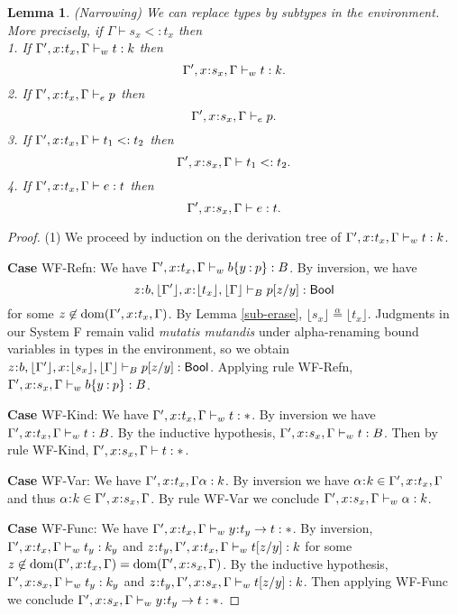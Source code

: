 \documentclass[11pt]{article}
\newtheorem{lemma}[theorem]{Lemma}
\newcommand{\al}{\alpha}
\newcommand{\bind}{\hspace{0.05em}{:}\hspace{0.05em}} %
\newcommand{\col}{\mathbin{:}}       %
\newcommand{\Bool}{{\sf Bool}}
\newcommand{\functype}[3]{#1\bind #2 \rightarrow #3}
\newcommand{\dom}[1]{{\rm dom}(#1)}
\begin{document}
\begin{lemma}\label{subtype-env} (Narrowing)
We can replace types by subtypes in the environment. More precisely, if $\Gamma \vdash s_x <: t_x$ then \\
1. If $\Gamma', x\bind t_x, \Gamma \vdash_w t : k$ then
\[
\Gamma', x\bind s_x, \Gamma \vdash_w t : k.
\]
2. If $\Gamma', x\bind t_x, \Gamma \vdash_e p$ then 
\[
\Gamma', x\bind s_x, \Gamma \vdash_e p. 
\]
3. If $\Gamma', x\bind t_x, \Gamma \vdash t_1 <: t_2$ then
\[
\Gamma', x\bind s_x, \Gamma \vdash t_1 <: t_2.
\]
4. If $\Gamma', x\bind t_x, \Gamma \vdash e : t$ then
\[
\Gamma', x\bind s_x, \Gamma \vdash e : t.
\]
\end{lemma}
\begin{proof}
(1) We proceed by induction on the derivation tree of $\Gamma', x\bind t_x, \Gamma \vdash_w t : k$.

{\bf Case} {\sc WF-Refn}: We have $\Gamma', x\bind t_x, \Gamma \vdash_w b\{y\col p\} : B$. By inversion, we have 
\begin{equation}
z\bind b, \lfloor \Gamma'\rfloor, x\bind \lfloor t_x\rfloor, \lfloor\Gamma\rfloor \vdash_B p[z/y] : \Bool
\end{equation}
for some $z\not\in\dom{\Gamma', x\bind t_x, \Gamma}$. By Lemma \ref{sub-erase}, $\lfloor s_x\rfloor \overset{\al}{=} \lfloor t_x\rfloor$. Judgments in our System F remain valid {\em mutatis mutandis} under alpha-renaming bound variables in types in the environment, so we obtain $z\bind b, \lfloor \Gamma'\rfloor, x\bind \lfloor s_x\rfloor, \lfloor\Gamma\rfloor \vdash_B p[z/y] : \Bool$. Applying rule {\sc WF-Refn}, $\Gamma', x\bind s_x, \Gamma \vdash_w b\{y\col p\} : B$.

{\bf Case} {\sc WF-Kind}: We have $\Gamma', x\bind t_x, \Gamma \vdash_w t : *$. By inversion we have $\Gamma', x\bind t_x, \Gamma \vdash_w t : B$. By the inductive hypothesis, $\Gamma', x\bind s_x, \Gamma \vdash_w t : B$. Then by rule {\sc WF-Kind}, $\Gamma', x\bind s_x, \Gamma \vdash t: *$.

{\bf Case} {\sc WF-Var}: We have $\Gamma', x\bind t_x, \Gamma \al : k$. By inversion we have $\al\bind k \in \Gamma', x\bind t_x, \Gamma$ and thus $\al\bind k \in \Gamma', x\bind s_x, \Gamma$. By rule {\sc WF-Var} we conclude $\Gamma', x\bind s_x, \Gamma \vdash_w \al : k$.

{\bf Case} {\sc WF-Func}: We have $\Gamma', x\bind t_x, \Gamma \vdash_w \functype{y}{t_y}{t} : *$. By inversion, $\Gamma', x\bind t_x, \Gamma \vdash_w t_y : k_y$ and $z\bind t_y, \Gamma', x\bind t_x, \Gamma \vdash_w t[z/y] : k$ for some $z\not\in\dom{\Gamma', x\bind t_x, \Gamma} = \dom{\Gamma', x\bind s_x, \Gamma}$. By the inductive hypothesis, $\Gamma', x\bind s_x, \Gamma \vdash_w t_y : k_y$ and $z\bind t_y, \Gamma', x\bind s_x, \Gamma \vdash_w t[z/y] : k$. Then applying {\sc WF-Func} we conclude $\Gamma', x\bind s_x, \Gamma \vdash_w \functype{y}{t_y}{t} : *$.


\end{proof}
\end{document}

